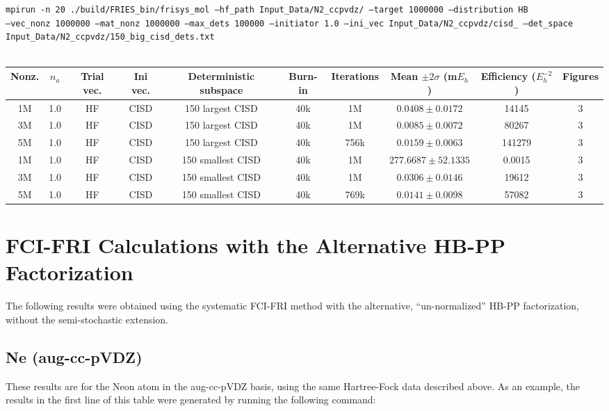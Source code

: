 \documentclass[12pt, landscape]{article}
\begin{document}
\texttt{mpirun -n 20 ./build/FRIES\_bin/frisys\_mol --hf\_path Input\_Data/N2\_ccpvdz/ --target 1000000 --distribution HB}\\ \texttt{--vec\_nonz 1000000 --mat\_nonz 1000000 --max\_dets 100000 --initiator 1.0 --ini\_vec Input\_Data/N2\_ccpvdz/cisd\_ --det\_space Input\_Data/N2\_ccpvdz/150\_big\_cisd\_dets.txt}
\\~\\
\begin{tabular}{c|c|c|c|c|c|c|c|c|c}
Nonz. & $n_a$ & Trial vec. & Ini vec. & Deterministic subspace & Burn-in & Iterations & Mean $\pm 2 \sigma$ (m$E_h$) & Efficiency ($E_h^{-2}$) & Figures \\ \hline
1M & 1.0 & HF & CISD & 150 largest CISD & 40k & 1M & $0.0408 \pm 0.0172$ & 14145 & 3 \\
3M & 1.0 & HF & CISD & 150 largest CISD & 40k & 1M & $0.0085 \pm 0.0072$ & 80267 & 3 \\
5M & 1.0 & HF & CISD & 150 largest CISD & 40k & 756k & $0.0159 \pm 0.0063$ & 141279 & 3 \\
1M & 1.0 & HF & CISD & 150 smallest CISD & 40k & 1M & $277.6687 \pm 52.1335$ & 0.0015 & 3 \\
3M & 1.0 & HF & CISD & 150 smallest CISD & 40k & 1M & $0.0306 \pm 0.0146$ & 19612 & 3 \\
5M & 1.0 & HF & CISD & 150 smallest CISD & 40k & 769k & $0.0141 \pm 0.0098$ & 57082 & 3 \\
\end{tabular}

\section*{FCI-FRI Calculations with the Alternative HB-PP Factorization}

The following results were obtained using the systematic FCI-FRI method with the alternative, ``un-normalized'' HB-PP factorization, without the semi-stochastic extension.

\subsection*{Ne (aug-cc-pVDZ)}
These results are for the Neon atom in the aug-cc-pVDZ basis, using the same Hartree-Fock data described above. As an example, the results in the first line of this table were generated by running the following command:
\end{document}
